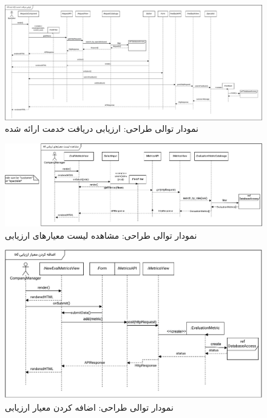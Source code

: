 \eject \pdfpagewidth=17in \pdfpageheight=8in


\begin{figure}[ht!]
	\centering
	\includegraphics[scale=0.8]{figs/design-sequence/3-25.pdf}
	\caption{نمودار توالی طراحی: ارزیابی دریافت خدمت ارائه شده}
\end{figure}
\FloatBarrier
\newpage

\eject \pdfpagewidth=13in \pdfpageheight=6in


\begin{figure}[ht!]
	\centering
	\includegraphics[scale=0.8]{figs/design-sequence/3-26.pdf}
	\caption{نمودار توالی طراحی: مشاهده لیست معیارهای ارزیابی}
\end{figure}
\FloatBarrier
\newpage

\eject \pdfpagewidth=10in \pdfpageheight=8in

\begin{figure}[ht!]
	\centering
	\includegraphics[scale=0.8]{figs/design-sequence/3-27.pdf}
	\caption{نمودار توالی طراحی: اضافه کردن معیار ارزیابی}
\end{figure}
\FloatBarrier
\newpage


